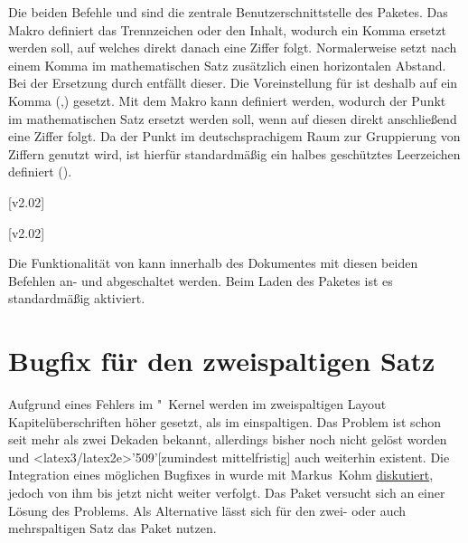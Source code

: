 \begin{DeclareEntity}{}
\begin{Declaration}
\begin{Declaration}
Die beiden Befehle  und  sind die zentrale 
Benutzerschnittstelle des Paketes. Das Makro  definiert das 
Trennzeichen oder den Inhalt, wodurch ein Komma ersetzt werden soll, auf 
welches direkt danach eine Ziffer folgt. Normalerweise setzt 
nach einem Komma im mathematischen Satz zusätzlich einen horizontalen Abstand.
Bei der Ersetzung durch  entfällt dieser. Die Voreinstellung
für  ist deshalb auf ein Komma (,) gesetzt. Mit dem Makro 
 kann definiert werden, wodurch der Punkt im mathematischen 
Satz ersetzt werden soll, wenn auf diesen direkt anschließend eine Ziffer 
folgt. Da der Punkt im deutschsprachigem Raum zur Gruppierung von Ziffern 
genutzt wird, ist hierfür standardmäßig ein halbes geschütztes Leerzeichen 
definiert (\Macro*{,}).
\end{Declaration}
\end{Declaration}

\begin{Declaration}
  {}
  [v2.02]
\begin{Declaration}
  {}
  [v2.02]
\printdeclarationlist

%
Die Funktionalität von  kann innerhalb des Dokumentes mit 
diesen beiden Befehlen an- und abgeschaltet werden. Beim Laden des Paketes ist 
es standardmäßig aktiviert.%
\end{Declaration}
\end{Declaration}
\end{DeclareEntity}
%
%



\section[%
  Das Paket \Package{twocolfix} -- Bugfix für den zweispaltigen Satz%
]{%
  Bugfix für den zweispaltigen Satz%
}

\begin{DeclareEntity}{}
Aufgrund eines Fehlers im "~Kernel werden im zweispaltigen 
Layout Kapitelüberschriften höher gesetzt, als im einspaltigen. Das Problem ist 
schon seit mehr als zwei Dekaden bekannt, allerdings bisher noch nicht gelöst 
worden und \GitHubRepo<latex3/latex2e>'509'[zumindest mittelfristig] auch 
weiterhin existent. Die Integration eines möglichen Bugfixes in \KOMAScript 
wurde mit Markus~Kohm \href{http://www.komascript.de/node/1681}{diskutiert}, 
jedoch von ihm bis jetzt nicht weiter verfolgt. Das Paket  
versucht sich an einer Lösung des Problems. Als Alternative lässt sich für den 
zwei- oder auch mehrspaltigen Satz das Paket  nutzen.
\end{DeclareEntity}



